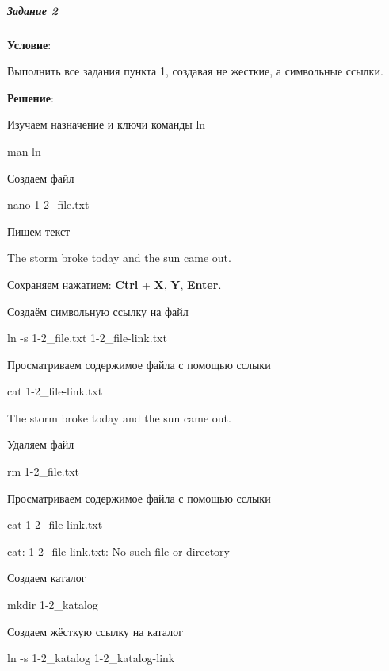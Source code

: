 \subparagraph{Задание 2} \textbf{Условие}:

Выполнить все задания пункта 1, создавая не жесткие, а символьные ссылки.

\textbf{Решение}:

Изучаем назначение и ключи команды ln

\begin{BashBox}
    man ln
\end{BashBox}

Создаем файл

\begin{BashBox}
    nano 1-2_file.txt
\end{BashBox}

Пишем текст

\begin{BashBox}
    The storm broke today
    and the sun came out.
\end{BashBox}

Сохраняем нажатием: \textbf{Ctrl} + \textbf{X}, \textbf{Y}, \textbf{Enter}.

Создаём символьную ссылку на файл

\begin{BashBox}
    ln -s 1-2_file.txt 1-2_file-link.txt
\end{BashBox}

Просматриваем содержимое файла с помощью сслыки

\begin{BashBox}
    cat 1-2_file-link.txt
\end{BashBox}

\begin{OutBox}
    The storm broke today
    and the sun came out.
\end{OutBox}

Удаляем файл

\begin{BashBox}
    rm 1-2_file.txt
\end{BashBox}

Просматриваем содержимое файла с помощью сслыки

\begin{BashBox}
    cat 1-2_file-link.txt
\end{BashBox}

\begin{OutBox}
    cat: 1-2_file-link.txt: No such file or directory
\end{OutBox}

Создаем каталог

\begin{BashBox}
    mkdir 1-2_katalog
\end{BashBox}

Создаем жёсткую ссылку на каталог

\begin{BashBox}
    ln -s 1-2_katalog 1-2_katalog-link
\end{BashBox}
